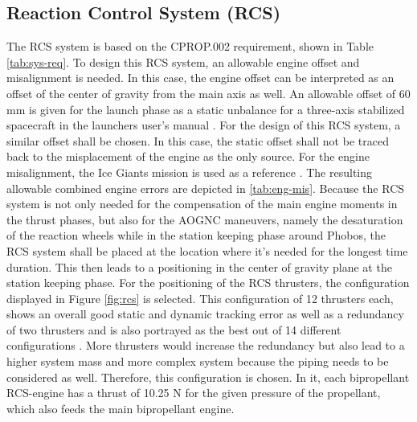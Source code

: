 \documentclass[conference]{IEEEtran}
\begin{document}
\subsection{Reaction Control System (RCS)}

The RCS system is based on the CPROP.002 requirement, shown in Table \ref{tab:sys-req}. To design this RCS system, an allowable engine offset and misalignment is needed. In this case, the engine offset can be interpreted as an offset of the center of gravity from the main axis as well. An allowable offset of 60 mm is given for the launch phase as a static unbalance for a three-axis stabilized spacecraft in the launchers user's manual \cite{Arianspace.2016}. For the design of this RCS system, a similar offset shall be chosen. In this case, the static offset shall not be traced back to the misplacement of the engine as the only source. For the engine misalignment, the Ice Giants mission is used as a reference \cite{ESA.2019}. The resulting allowable combined engine errors are depicted in \ref{tab:eng-mis}. Because the RCS system is not only needed for the compensation of the main engine moments in the thrust phases, but also for the AOGNC maneuvers, namely the desaturation of the reaction wheels while in the station keeping phase around Phobos, the RCS system shall be placed at the location where it's needed for the longest time duration. This then leads to a positioning in the center of gravity plane at the station keeping phase. For the positioning of the RCS thrusters, the configuration displayed in Figure \ref{fig:rcs} is selected. This configuration of 12 thrusters each, shows an overall good static and dynamic tracking error as well as a redundancy of two thrusters and is also portrayed as the best out of 14 different configurations \cite{Pasand.2017}. More thrusters would increase the redundancy but also lead to a higher system mass and more complex system because the piping needs to be considered as well. Therefore, this configuration is chosen. In it, each bipropellant RCS-engine has a thrust of 10.25 N for the given pressure of the propellant, which also feeds the main bipropellant engine.

\begin{table}[H]
\caption{Allowable engine misalignment}
\label{tab:eng-mis}
\centering
{}
\end{table}
\end{document}

